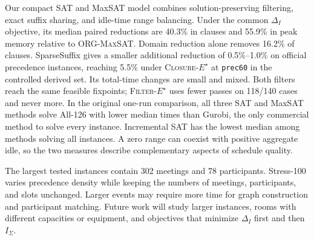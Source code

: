 \documentclass[conference,a4paper]{IEEEtran}
\newcommand{\revised}[1]{#1}
\begin{document}
\revised{Our compact SAT and MaxSAT model combines solution-preserving filtering, exact suffix sharing, and idle-time range balancing. Under the common $\Delta_I$ objective, its median paired reductions are 40.3\% in clauses and 55.9\% in peak memory relative to \mbox{\textsc{ORG-MaxSAT}}. Domain reduction alone removes 16.2\% of clauses. SparseSuffix gives a smaller additional reduction of 0.5\%--1.0\% on official precedence instances, reaching 5.5\% under \mbox{\textsc{Closure-}$E^\star$} at \texttt{prec60} in the controlled derived set. Its total-time changes are small and mixed. Both filters reach the same feasible fixpoints; \mbox{\textsc{Filter-}$E^\star$} uses fewer passes on 118/140 cases and never more. In the original one-run comparison, all three SAT and MaxSAT methods solve All-126 with lower median times than Gurobi, the only commercial method to solve every instance. Incremental SAT has the lowest median among methods solving all instances. A zero range can coexist with positive aggregate idle, so the two measures describe complementary aspects of schedule quality.}

\revised{The largest tested instances contain 302 meetings and 78 participants. Stress-100 varies precedence density while keeping the numbers of meetings, participants, and slots unchanged. Larger events may require more time for graph construction and participant matching. Future work will study larger instances, rooms with different capacities or equipment, and objectives that minimize $\Delta_I$ first and then $I_\Sigma$.}
\end{document}
